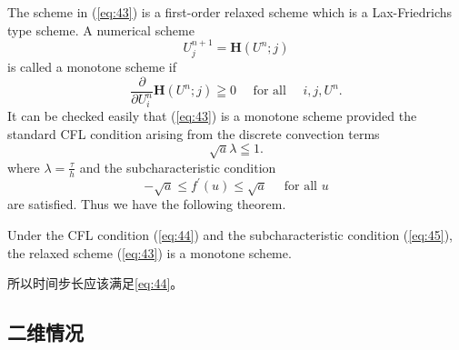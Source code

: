 \documentclass[12pt]{article}
\begin{document}
The scheme in (\ref{eq:43}) is a first-order relaxed scheme which is a Lax-Friedrichs type scheme. A numerical scheme
\begin{equation}
	U_{j}^{n+1}=\mathbf{H}\left(U^{n} ; j\right)
\end{equation}
is called a monotone scheme if
\begin{equation}
	\frac{\partial}{\partial U_{i}^{n}} \mathbf{H}\left(U^{n} ; j\right) \geqq 0 \quad \text { for all } \quad i, j, U^{n}.
\end{equation}
It can be checked easily that (\ref{eq:43}) is a monotone scheme provided the standard CFL condition arising from the discrete convection terms
\begin{equation}
	\sqrt{a} \lambda \leqq 1.
	\label{eq:44}
\end{equation}
where $\lambda = \frac{\tau}{h}$ and the subcharacteristic condition 
\begin{equation}
	-\sqrt{a} \leq f^{\prime}(u) \leq \sqrt{a} \quad \text { for all } u
	\label{eq:45}
\end{equation}
are satisfied. Thus we have the following theorem.

Under the CFL condition (\ref{eq:44}) and the subcharacteristic condition (\ref{eq:45}), the relaxed scheme (\ref{eq:43}) is a monotone scheme.

所以时间步长应该满足\cref{eq:44}。

\subsection{二维情况}
\end{document}
